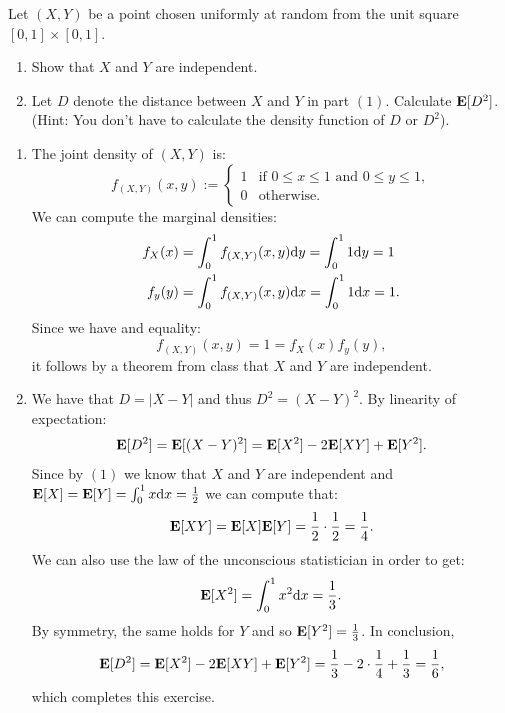 \documentclass[11pt,a4paper]{article}
\begin{document}
\begin{exercise}
  Let $(X,Y)$ be a point chosen uniformly at random from the unit square
  $[0,1] \times [0,1]$.
  \begin{enumerate}
    \item[(1)] Show that $X$ and $Y$ are independent.
    \item[(2)] Let $D$ denote the distance between $X$ and $Y$ in part $(1)$.
      Calculate $\mathbf{E}[D^2]$.
      (Hint: You don't have to calculate the density function of $D$ or $D^2$).
  \end{enumerate}
\end{exercise}
\begin{solution} \phantom{}
  \begin{enumerate}
    \item[(1)] The joint density of $(X,Y)$ is:
      \[
        f_{(X,Y)}(x,y) :=
        \begin{cases}
          1 &\text{if $0 \le x \le 1$ and $0 \le y \le 1$}, \\
          0 &\text{otherwise}.
        \end{cases}
      \]
      We can compute the marginal densities:
      \begin{align*}
        f_X(x) &=
        \int_{0}^{1} f_{(X,Y)}(x,y) \dy =
        \int_{0}^{1} 1 \dy = 1 \\
        f_y(y) &=
        \int_{0}^{1} f_{(X,Y)}(x,y) \dx =
        \int_{0}^{1} 1 \dx = 1.
      \end{align*}
      Since we have and equality:
      \[
        f_{(X,Y)}(x,y) = 1 = f_X(x) f_y(y),
      \]
      it follows by a theorem from class that $X$ and $Y$ are independent.
    \item[(2)] We have that $D = |X - Y|$ and thus $D^2 = (X - Y)^2$.
      By linearity of expectation:
      \[
        \mathbf{E}[D^2] =
        \mathbf{E}[(X-Y)^2] =
        \mathbf{E}[X^2] - 2\mathbf{E}[XY] + \mathbf{E}[Y^2].
      \]
      Since by $(1)$ we know that $X$ and $Y$ are independent
      and $\E[X] = \E[Y] = \int_{0}^{1} x \dx = \half$ we can compute that:
      \[
        \mathbf{E}[XY] = \mathbf{E}[X] \mathbf{E}[Y] = \frac{1}{2} \cdot \frac{1}{2} = \frac{1}{4}.
      \]
      We can also use the law of the unconscious statistician in order
      to get:
      \[
        \E[X^2] = \int_{0}^{1} x^2 \dx = \frac{1}{3}.
      \]
      By symmetry, the same holds for $Y$ and so $\mathbf{E}[Y^2] = \frac{1}{3}$.
      In conclusion,
      \[
        \mathbf{E}[D^2] =
        \mathbf{E}[X^2] - 2\mathbf{E}[XY] + \mathbf{E}[Y^2] =
        \frac{1}{3} - 2 \cdot \frac{1}{4} + \frac{1}{3} =
        \frac{1}{6},
      \]
      which completes this exercise.
   \end{enumerate}
\end{solution}
\end{document}
